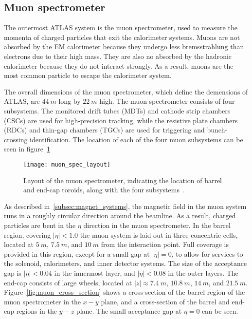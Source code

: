 \subsection{Muon spectrometer}\label{subsec:muon_spec}

The outermost ATLAS system is the muon spectrometer, used to measure the momenta of charged particles that exit the calorimeter systems.
Muons are not absorbed by the EM calorimeter because they undergo less bremsstrahlung than electrons due to their high mass.
They are also no absorbed by the hadronic calorimeter because they do not interact strongly.
As a result, muons are the most common particle to escape the calorimeter system.

The overall dimensions of the muon spectrometer, which define the demensions of ATLAS, are $44~m$ long by $22~m$ high.
The muon spectrometer consists of four subsystems.
The monitored drift tubes (MDTs) and cathode strip chambers (CSCs) are used for high-precision tracking,
while the resistive plate chambers (RDCs) and thin-gap chambers (TGCs) are used for triggering and bunch-crossing identification.
The location of each of the four muon subsystems can be seen in figure~\ref{fig:muon_spec_layout}

\begin{figure}[!ht]\centering
\texttt{[image: muon\_spec\_layout]}
\caption{Layout of the muon spectrometer, indicating the location of barrel and end-cap toroids, along with the four subsystems~\cite{atlas-detector-2008}.}
\label{fig:muon_spec_layout}
\end{figure}

As described in~\ref{subsec:magnet_systems}, the magnetic field in the muon system runs in a roughly circular direction around the beamline.
As a result, charged particles are bent in the $\eta$ direction in the muon spectrometer.
In the barrel region, covering $|\eta| < 1.0$ the muon system is laid out in three concentric cells, located at $5~m$, $7.5~m$, and $10~m$ from the interaction point.
Full coverage is provided in this region, except for a small gap at $|\eta| = 0$, to allow for services to the solenoid, calorimeters, and inner detector systems.
The size of the acceptance gap is $|\eta| < 0.04$ in the innermost layer, and $|\eta| < 0.08$ in the outer layers.
The end-cap consists of large wheels, located at $|z| \approx 7.4~m$, $10.8~m$, $14~m$, and $21.5~m$.
Figure~\ref{fig:muon_cross_section} shows a cross-section of the barrel region of the muon spectrometer in the $x-y$ plane, and a cross-section of the barrel and end-cap regions in the $y-z$ plane.
The small acceptance gap at $\eta = 0$ can be seen.

